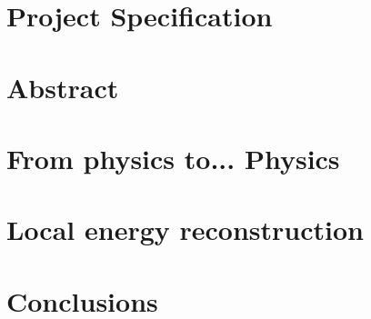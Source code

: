 \documentclass[a4paper,10pt,twoside]{report}
\author{\me}
\begin{document}
\linenumbers




\normalsize

\newpage

\chapter*{\textcolor{OpenlabDarkBlue}{Project Specification} }\label{chapter:specification}


\chapter*{\textcolor{OpenlabDarkBlue}{Abstract}} \label{chapter:abstract}


\begingroup
\color{OpenlabDarkBlue}
\tableofcontents
\endgroup

\listoffigures

\listoftables

\lstlistoflistings


\clearpage

\setcounter{page}{10}
\chapter{From physics to... Physics}\label{chapter:01}


\chapter{Local energy reconstruction}\label{chapter:02}


\chapter{Conclusions}\label{chapter:conclusions}


%



\clearpage %
\appendix
{} %


\end{document}
